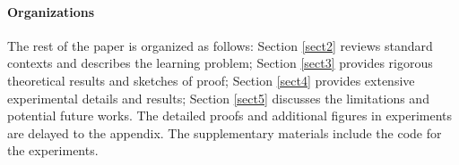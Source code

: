 \paragraph{Organizations} The rest of the paper is organized as follows: Section \ref{sect2} reviews standard contexts and describes the learning problem; Section \ref{sect3} provides rigorous theoretical results and sketches of proof; Section \ref{sect4} provides extensive experimental details and results; Section \ref{sect5} discusses the limitations and potential future works. The detailed proofs and additional figures in experiments are delayed to the appendix. The supplementary materials include the code for the experiments.
    
